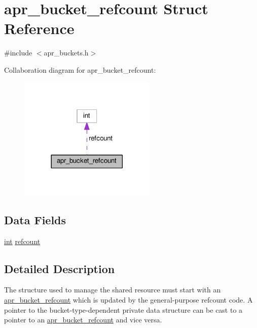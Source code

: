 \hypertarget{structapr__bucket__refcount}{}\section{apr\+\_\+bucket\+\_\+refcount Struct Reference}
\label{structapr__bucket__refcount}


{\ttfamily \#include $<$apr\+\_\+buckets.\+h$>$}



Collaboration diagram for apr\+\_\+bucket\+\_\+refcount\+:
\nopagebreak
\begin{figure}[H]
\begin{center}
\leavevmode
\includegraphics[width=185pt]{structapr__bucket__refcount__coll__graph}
\end{center}
\end{figure}
\subsection*{Data Fields}
\begin{DoxyCompactItemize}
\item 
\hyperlink{pcre_8txt_a42dfa4ff673c82d8efe7144098fbc198}{int} \hyperlink{structapr__bucket__refcount_a75040af03e3ad3c722bccea1048e3dae}{refcount}
\end{DoxyCompactItemize}


\subsection{Detailed Description}
The structure used to manage the shared resource must start with an \hyperlink{structapr__bucket__refcount}{apr\+\_\+bucket\+\_\+refcount} which is updated by the general-\/purpose refcount code. A pointer to the bucket-\/type-\/dependent private data structure can be cast to a pointer to an \hyperlink{structapr__bucket__refcount}{apr\+\_\+bucket\+\_\+refcount} and vice versa. 

